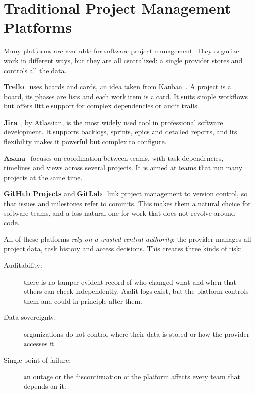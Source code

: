 \section{Traditional Project Management Platforms}
\label{sec:traditional-pm}

Many platforms are available for software project management. They organize work in different ways, but they are all centralized: a single provider stores and controls all the data.

\textbf{Trello}~\cite{trello} uses boards and cards, an idea taken from Kanban~\cite{anderson2010kanban}. A project is a board, its phases are lists and each work item is a card. It suits simple workflows but offers little support for complex dependencies or audit trails.

\textbf{Jira}~\cite{jira}, by Atlassian, is the most widely used tool in professional software development. It supports backlogs, sprints, epics and detailed reports, and its flexibility makes it powerful but complex to configure.

\textbf{Asana}~\cite{asana} focuses on coordination between teams, with task dependencies, timelines and views across several projects. It is aimed at teams that run many projects at the same time.

\textbf{GitHub Projects} and \textbf{GitLab}~\cite{github,gitlab} link project management to version control, so that issues and milestones refer to commits. This makes them a natural choice for software teams, and a less natural one for work that does not revolve around code.

All of these platforms \emph{rely on a trusted central authority}: the provider manages all project data, task history and access decisions. This creates three kinds of risk:

\begin{description}
    \item[Auditability:] there is no tamper-evident record of who changed what and when that others can check independently. Audit logs exist, but the platform controls them and could in principle alter them.
    \item[Data sovereignty:] organizations do not control where their data is stored or how the provider accesses it.
    \item[Single point of failure:] an outage or the discontinuation of the platform affects every team that depends on it.
\end{description}

